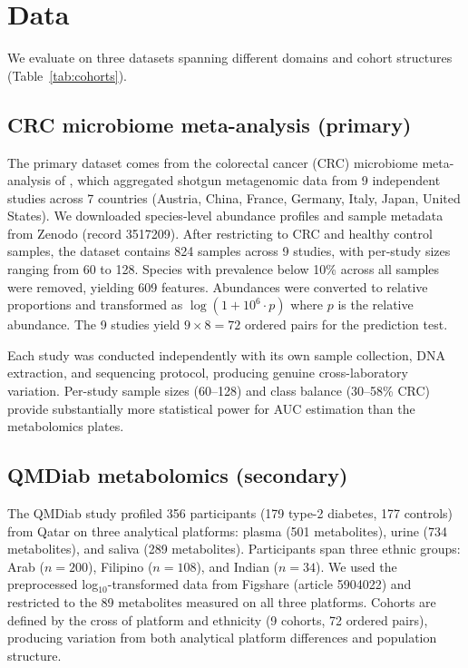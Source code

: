 \documentclass{article}
\begin{document}
\section{Data}

We evaluate on three datasets spanning different domains and cohort structures (Table~\ref{tab:cohorts}).

\subsection{CRC microbiome meta-analysis (primary)}
\label{sec:crc_data}

The primary dataset comes from the colorectal cancer (CRC) microbiome meta-analysis of \citet{wirbel2019meta}, which aggregated shotgun metagenomic data from 9 independent studies across 7 countries (Austria, China, France, Germany, Italy, Japan, United States). We downloaded species-level abundance profiles and sample metadata from Zenodo (record 3517209). After restricting to CRC and healthy control samples, the dataset contains 824 samples across 9 studies, with per-study sizes ranging from 60 to 128. Species with prevalence below 10\% across all samples were removed, yielding 609 features. Abundances were converted to relative proportions and transformed as $\log(1 + 10^6 \cdot p)$ where $p$ is the relative abundance. The 9 studies yield $9 \times 8 = 72$ ordered pairs for the prediction test.

Each study was conducted independently with its own sample collection, DNA extraction, and sequencing protocol, producing genuine cross-laboratory variation. Per-study sample sizes (60--128) and class balance (30--58\% CRC) provide substantially more statistical power for AUC estimation than the metabolomics plates.

\subsection{QMDiab metabolomics (secondary)}
\label{sec:qmdiab_data}

The QMDiab study \citep{yousri2015metabolic} profiled 356 participants (179 type-2 diabetes, 177 controls) from Qatar on three analytical platforms: plasma (501 metabolites), urine (734 metabolites), and saliva (289 metabolites). Participants span three ethnic groups: Arab ($n = 200$), Filipino ($n = 108$), and Indian ($n = 34$). We used the preprocessed log$_{10}$-transformed data from Figshare (article 5904022) and restricted to the 89 metabolites measured on all three platforms. Cohorts are defined by the cross of platform and ethnicity (9 cohorts, 72 ordered pairs), producing variation from both analytical platform differences and population structure.
\end{document}

